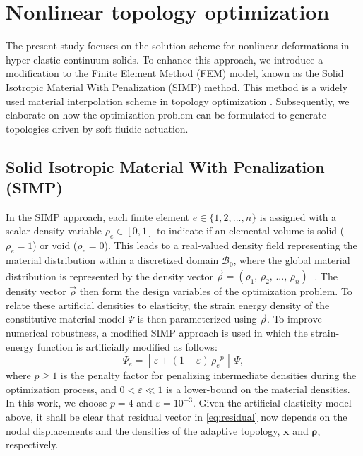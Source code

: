 \section{Nonlinear topology optimization}
\label{sec:C1:topo} 
The present study focuses on the solution scheme for nonlinear deformations in hyper-elastic continuum solids. To enhance this approach, we introduce a modification to the Finite Element Method (FEM) model, known as the Solid Isotropic Material With Penalization (SIMP) method. This method is a widely used material interpolation scheme in topology optimization \cite{Bendsoe2003,Gain2013Dec,Talischi2012Mar,Vasista2013Jul}. Subsequently, we elaborate on how the optimization problem can be formulated to generate topologies driven by soft fluidic actuation.

\subsection{Solid Isotropic Material With Penalization (SIMP)}
In the SIMP approach, each finite element $e \in \{1,2,...,n\}$ is assigned with a scalar density variable $\rho_e \in [0,1]$ to indicate if an elemental volume is solid ($\rho_e = 1$) or void ($\rho_e = 0$). This leads to a real-valued density field representing the material distribution within a discretized domain $\mathcal{B}_0$, where the global material distribution is represented by the density vector $\vec{\rho} = \left(\rho_1,\,\rho_2,\,...,\,\rho_n\right)^\top$. The density vector $\vec{\rho}$ then form the design variables of the optimization problem. To relate these artificial densities to elasticity, the strain energy density of the constitutive material model ${\Psi}$ is then parameterized using $\vec{\rho}$. To improve numerical robustness, a modified SIMP approach is used in which the strain-energy function is artificially modified as follows:
%
\begin{equation}
{\Psi}_e = [\,\varepsilon + (1-\varepsilon)\,{\rho_e}^p\,]\, {\Psi}, \label{eq:simp}
\end{equation}
%
where $p\ge 1$ is the penalty factor for penalizing intermediate densities during the optimization process, and $0 < \varepsilon \ll 1$ is a lower-bound on the material densities. In this work, we choose $p = 4$ and $\varepsilon = 10^{-3}$. Given the artificial elasticity model above, it shall be clear that residual vector in \eqref{eq:residual} now depends on the nodal displacements and the densities of the adaptive topology, $\boldsymbol{x}$ and $\boldsymbol{\rho}$, respectively.

